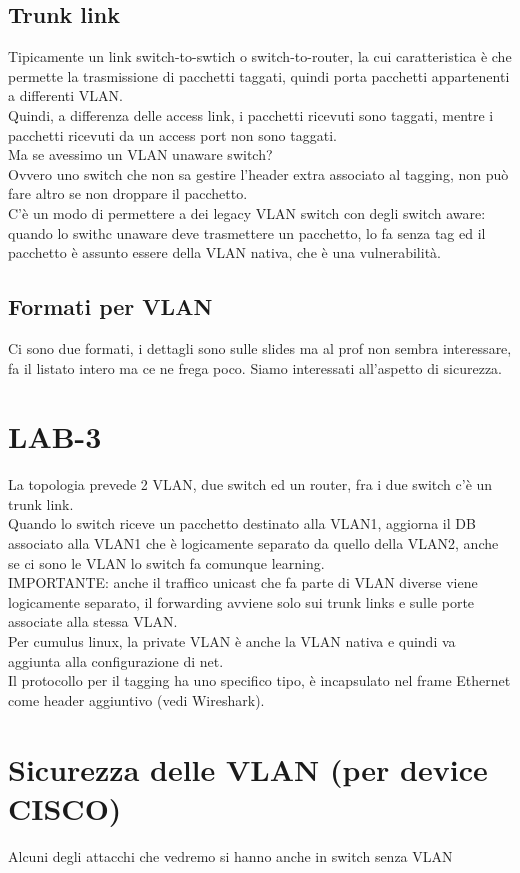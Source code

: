 \documentclass[12pt, oneside]{extbook} %
\begin{document}
\subsection{Trunk link}
Tipicamente un link switch-to-swtich o switch-to-router, la cui caratteristica è che permette la trasmissione di pacchetti taggati, quindi porta pacchetti appartenenti a differenti VLAN.
\\Quindi, a differenza delle access link, i pacchetti ricevuti sono taggati, mentre i pacchetti ricevuti da un access port non sono taggati.
\\Ma se avessimo un VLAN unaware switch?
\\Ovvero uno switch che non sa gestire l'header extra associato al tagging, non può fare altro se non droppare il pacchetto.
\\C'è un modo di permettere a dei legacy VLAN switch con degli switch aware: quando lo swithc unaware deve trasmettere un pacchetto, lo fa senza tag ed il pacchetto è assunto essere della VLAN nativa, che è una vulnerabilità.
\subsection{Formati per VLAN}
Ci sono due formati, i dettagli sono sulle slides ma al prof non sembra interessare, fa il listato intero ma ce ne frega poco. Siamo interessati all'aspetto di sicurezza.

\section*{LAB-3}
La topologia prevede 2 VLAN, due switch ed un router, fra i due switch c'è un trunk link.
\\Quando lo switch riceve un pacchetto destinato alla VLAN1, aggiorna il DB associato alla VLAN1 che è logicamente separato da quello della VLAN2, anche se ci sono le VLAN lo switch fa comunque learning.
\\IMPORTANTE: anche il traffico unicast che fa parte di VLAN diverse viene logicamente separato, il forwarding avviene solo sui trunk links e sulle porte associate alla stessa VLAN.
\\Per cumulus linux, la private VLAN è anche la VLAN nativa e quindi va aggiunta alla configurazione di net.
\\Il protocollo per il tagging ha uno specifico tipo, è incapsulato nel frame Ethernet come header aggiuntivo (vedi Wireshark).

\section{Sicurezza delle VLAN (per device CISCO)}
Alcuni degli attacchi che vedremo si hanno anche in switch senza VLAN
\end{document}
